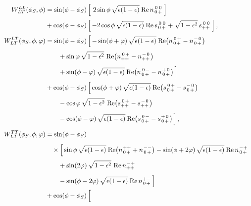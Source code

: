 \documentclass[12pt]{article}
\newcommand{\ms}{\mskip 1.5mu}
\newcommand{\re}{\operatorname{Re}}
\newcommand{\rs}[4]{s^{\ms #1 #2}_{#3 #4}}
\newcommand{\rn}[4]{n^{\ms #1 #2}_{#3 #4}}
\newcommand{\0}{{\mskip 2.5mu} 0 {\mskip 2.5mu}}
\begin{document}
\begin{align}
  \label{WLT}
W_{LT}^{LL}(\phi_S,\phi) &=
\sin(\phi-\phi_S)\, \Bigl[\,\,
  2\sin\phi\, \sqrt{\epsilon (1-\epsilon)}\ms \re\rn{\0}{\0}{\0}{+}
\,\Bigr]
  \phantom{\frac{1}{2}}
\nonumber \\
& {}
+ \cos(\phi-\phi_S)\, \Bigl[\,
  - 2\cos\phi\, \sqrt{\epsilon (1-\epsilon)}\ms \re\rs{\0}{\0}{\0}{+}
  + \sqrt{1 - \epsilon^2}\, \rs{\0}{\0}{+}{+}
\,\Bigr] \,,
  \phantom{\frac{1}{2}}
\nonumber \\
%
W_{LT}^{LT}(\phi_S,\phi,\varphi) &=
\sin(\phi-\phi_S)\, \Bigl[\,
  - \sin(\phi + \varphi)\, \sqrt{\epsilon (1-\epsilon)}\ms
    \re\bigl( \rn{\0}{+}{\0}{+} - \rn{-}{\0}{\0}{+} \bigr)
  \phantom{\frac{1}{2}}
\nonumber \\
& \qquad{}
  + \sin\varphi\, \sqrt{1 - \epsilon^2}\,
    \re\bigl( \rn{\0}{+}{+}{+} - \rn{-}{\0}{+}{+} \bigr)
  \phantom{\frac{1}{2}}
\nonumber \\
& \qquad{}
  + \sin(\phi - \varphi)\, \sqrt{\epsilon (1-\epsilon)}\ms
    \re\bigl( \rn{\0}{-}{\0}{+} - \rn{+}{\0}{\0}{+} \bigr)
\,\Bigr]
  \phantom{\frac{1}{2}}
\nonumber \\
& {}
+ \cos(\phi-\phi_S)\, \Bigl[\,
  \cos(\phi + \varphi)\, \sqrt{\epsilon (1-\epsilon)}\ms
  \re\bigl( \rs{\0}{+}{\0}{+} - \rs{-}{\0}{\0}{+} \bigr)
  \phantom{\frac{1}{2}}
\nonumber \\
& \qquad{}
  - \cos\varphi\, \sqrt{1 - \epsilon^2}\,
    \re\bigl( \rs{\0}{+}{+}{+} - \rs{-}{\0}{+}{+} \bigr)
  \phantom{\frac{1}{2}}
\nonumber \\
& \qquad{}
  - \cos(\phi - \varphi)\, \sqrt{\epsilon (1-\epsilon)}\ms
    \re\bigl( \rs{\0}{-}{\0}{+} - \rs{+}{\0}{\0}{+} \bigr)
\,\Bigr] \,,
  \phantom{\frac{1}{2}}
\nonumber \\
%
W_{LT}^{TT}(\phi_S,\phi,\varphi) &=
\sin(\phi-\phi_S)\,
  \phantom{\frac{1}{2}}
\nonumber \\
& \quad\times \Bigl[\,
  \sin\phi\, \sqrt{\epsilon (1-\epsilon)}\ms
    \re\bigl( \rn{+}{+}{\0}{+} + \rn{-}{-}{\0}{+} \bigr)
  - \sin(\phi + 2\varphi)\, \sqrt{\epsilon (1-\epsilon)}\ms
    \re\rn{-}{+}{\0}{+}
  \phantom{\frac{1}{2}}
\nonumber \\
& \qquad{}
  + \sin(2\varphi)\, \sqrt{1 - \epsilon^2}\, \re\rn{-}{+}{+}{+}
  \phantom{\frac{1}{2}}
\nonumber \\
& \qquad{}
  - \sin(\phi - 2\varphi)\, \sqrt{\epsilon (1-\epsilon)}\ms
    \re\rn{+}{-}{\0}{+}
\,\Bigr]
  \phantom{\frac{1}{2}}
\nonumber \\
& {}
+ \cos(\phi-\phi_S)\, \Bigl[\,

\end{align}
\end{document}
